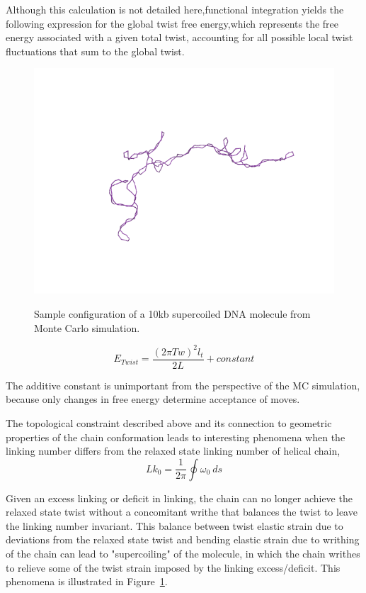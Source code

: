 \documentclass[english]{article}
\begin{document}
Although this calculation is not detailed here,functional integration yields the following expression for the global twist free energy,which represents the free energy associated with a given total twist, accounting for all possible local twist fluctuations that sum to the global twist.

\begin{figure}
\centering
\caption{Sample configuration of a 10kb supercoiled DNA molecule from Monte Carlo simulation.}

\includegraphics[scale=0.5]{figures/10kblk56.png}
\label{supercoil_example}
\end{figure}

\begin{equation}
E_{Twist}=\frac{(2\pi Tw)^2 l_t}{2L} + constant
\end{equation}

The additive constant is unimportant from the perspective of the MC simulation, because only changes in free energy determine acceptance of moves.		 

The topological constraint described above and its connection to geometric properties of the chain conformation leads to interesting phenomena when the linking number differs from the relaxed state linking number of helical chain, 
\begin{equation} 
Lk_0=\frac{1}{2\pi}\oint\omega_0~ds
\end{equation}

Given an excess linking or deficit in linking, the chain can no longer achieve the relaxed state twist without a concomitant writhe that balances the twist to leave the linking number invariant. This balance between twist elastic strain due to deviations from the relaxed state twist and bending elastic strain due to writhing of the chain can lead to "supercoiling" of the molecule, in which the chain writhes to relieve some of the twist strain imposed by the linking excess/deficit. This phenomena is illustrated in Figure~\ref{supercoil_example}.
\end{document}
